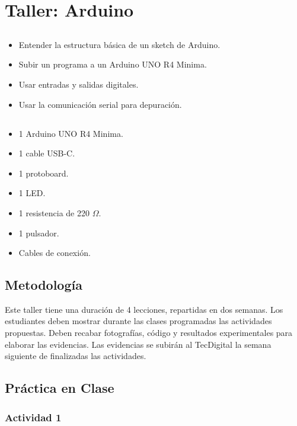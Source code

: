 \chapter{Taller: Arduino}

\section{\obj}
\capacidad
\begin{itemize}
    \item Entender la estructura básica de un sketch de Arduino.
    \item Subir un programa a un Arduino UNO R4 Minima.
    \item Usar entradas y salidas digitales.
    \item Usar la comunicación serial para depuración.
\end{itemize}

\section{\mat}
\begin{itemize}
    \item 1 Arduino UNO R4 Minima.
    \item 1 cable USB-C.
    \item 1 protoboard.
    \item 1 LED.
    \item 1 resistencia de 220 $\Omega$.
    \item 1 pulsador.
    \item Cables de conexi\'on.
\end{itemize}

\section{Metodología}

Este taller tiene una duración de 4 lecciones, repartidas en dos semanas. Los estudiantes deben mostrar durante las clases programadas las actividades propuestas. Deben recabar fotografías, código y resultados experimentales para elaborar las evidencias. Las evidencias se subirán al TecDigital la semana siguiente de finalizadas las actividades.

\section{Práctica en Clase}

\subsection{Actividad 1}

